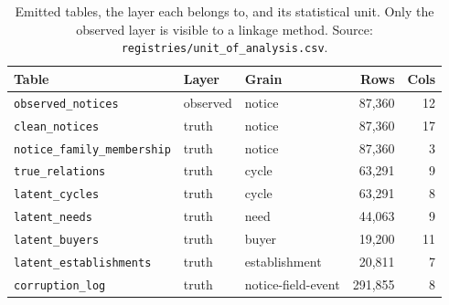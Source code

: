 \begin{table}[htbp]
\centering
\small
\caption{Emitted tables, the layer each belongs to, and its statistical unit. Only the observed layer is visible to a linkage method. Source: \texttt{registries/unit\_of\_analysis.csv}.}
\label{tab:units}
\begin{tabularx}{\textwidth}{>{\raggedright\arraybackslash}Xllrr}
\toprule
Table & Layer & Grain & Rows & Cols \\
\midrule
\texttt{observed\_notices} & observed & notice & 87{,}360 & 12 \\
\texttt{clean\_notices} & truth & notice & 87{,}360 & 17 \\
\texttt{notice\_family\_membership} & truth & notice & 87{,}360 & 3 \\
\texttt{true\_relations} & truth & cycle & 63{,}291 & 9 \\
\texttt{latent\_cycles} & truth & cycle & 63{,}291 & 8 \\
\texttt{latent\_needs} & truth & need & 44{,}063 & 9 \\
\texttt{latent\_buyers} & truth & buyer & 19{,}200 & 11 \\
\texttt{latent\_establishments} & truth & establishment & 20{,}811 & 7 \\
\texttt{corruption\_log} & truth & notice-field-event & 291{,}855 & 8 \\
\bottomrule
\end{tabularx}
\end{table}
